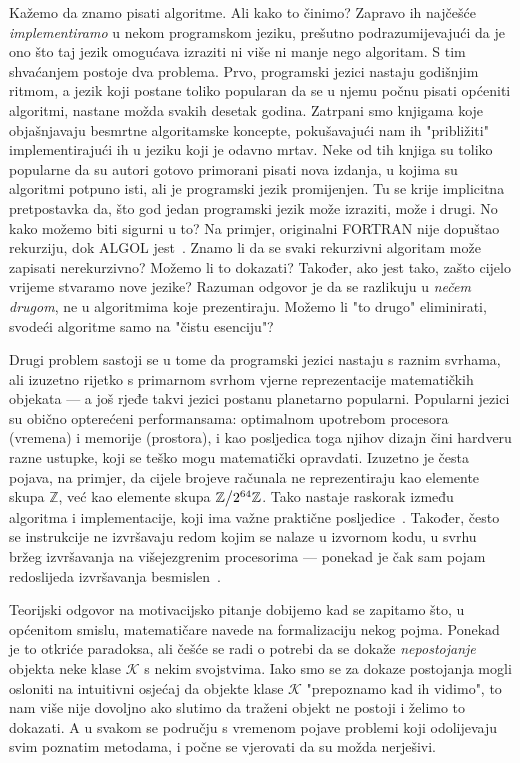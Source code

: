 Kažemo da znamo pisati algoritme. Ali kako to činimo? Zapravo ih najčešće \emph{implementiramo} u nekom programskom jeziku, prešutno podrazumijevajući da je ono što taj jezik omogućava izraziti ni više ni manje nego algoritam. S tim shvaćanjem postoje dva problema. Prvo, programski jezici nastaju godišnjim ritmom, a jezik koji postane toliko popularan da se u njemu počnu pisati općeniti algoritmi, nastane možda svakih desetak godina. Zatrpani smo knjigama koje objašnjavaju besmrtne algoritamske koncepte, pokušavajući nam ih "približiti" implementirajući ih u jeziku koji je odavno mrtav. Neke od tih knjiga su toliko popularne da su autori gotovo primorani pisati nova izdanja, u kojima su algoritmi potpuno isti, ali je programski jezik promijenjen. Tu se krije implicitna pretpostavka da, što god jedan programski jezik može izraziti, može i drugi. No kako možemo biti sigurni u to? Na primjer, originalni FORTRAN nije dopuštao rekurziju, dok ALGOL jest~\cite{url:recursionAlgol}. Znamo li da se svaki rekurzivni algoritam može zapisati nerekurzivno? Možemo li to dokazati? Također, ako jest tako, zašto cijelo vrijeme stvaramo nove jezike? Razuman odgovor je da se razlikuju u \emph{nečem drugom}, ne u algoritmima koje prezentiraju. Možemo li "to drugo" eliminirati, svodeći algoritme samo na "čistu esenciju"?

Drugi problem sastoji se u tome da programski jezici nastaju s raznim svrhama, ali izuzetno rijetko s primarnom svrhom vjerne reprezentacije matematičkih objekata --- a još rjeđe takvi jezici postanu planetarno popularni. Popularni jezici su obično opterećeni performansama: optimalnom upotrebom procesora (vremena) i memorije (prostora), i kao posljedica toga njihov dizajn čini hardveru razne ustupke, koji se teško mogu matematički opravdati. Izuzetno je česta pojava, na primjer, da cijele brojeve računala ne reprezentiraju kao elemente skupa $\mathbb Z$, već kao elemente skupa $\mathbb Z\big\slash2^{64}\mathbb Z$. Tako nastaje raskorak između algoritma i implementacije, koji ima važne praktične posljedice~\cite{url:wrongBinsearch}. Također, često se instrukcije ne izvršavaju redom kojim se nalaze u izvornom kodu, u svrhu bržeg izvršavanja na višejezgrenim procesorima --- ponekad je čak sam pojam redoslijeda izvršavanja besmislen~\cite[str.\ 10]{art:memorymodels}.

Teorijski odgovor na motivacijsko pitanje dobijemo kad se zapitamo što, u općenitom smislu, matematičare navede na formalizaciju nekog pojma. Ponekad je to otkriće paradoksa, ali češće se radi o potrebi da se dokaže \emph{nepostojanje} objekta neke klase $\mathcal K$ s nekim svojstvima. Iako smo se za dokaze postojanja mogli osloniti na intuitivni osjećaj da objekte klase $\mathcal K$ "prepoznamo kad ih vidimo", to nam više nije dovoljno ako slutimo da traženi objekt ne postoji i želimo to dokazati. A u svakom se području s vremenom pojave problemi koji odolijevaju svim poznatim metodama, i počne se vjerovati da su možda nerješivi.

